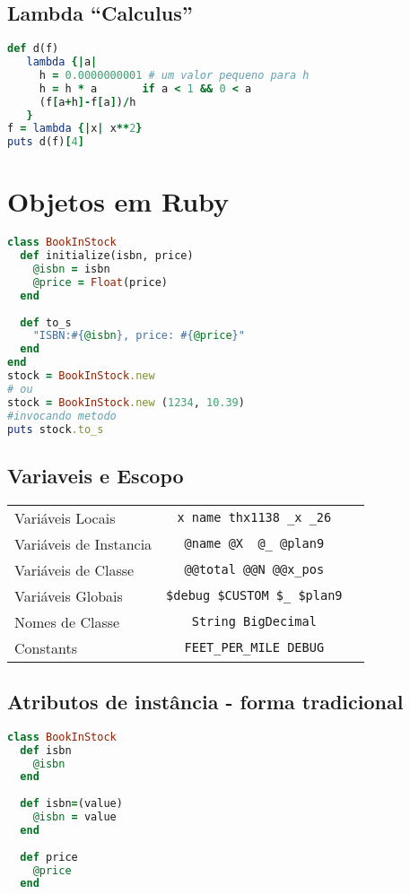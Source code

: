 \documentclass[serif,mathserif]{article}
\begin{document}
\subsection{Lambda ``Calculus''}

\begin{lstlisting}[language=ruby, caption="Derivada em Ruby"]
def d(f)
   lambda {|a|
     h = 0.0000000001 # um valor pequeno para h
     h = h * a       if a < 1 && 0 < a
     (f[a+h]-f[a])/h
   }
f = lambda {|x| x**2}
puts d(f)[4]
\end{lstlisting}

\section{Objetos em Ruby}
\begin{lstlisting}[language=ruby]
class BookInStock
  def initialize(isbn, price)
    @isbn = isbn
    @price = Float(price)
  end
 
  def to_s
    "ISBN:#{@isbn}, price: #{@price}"
  end
end
stock = BookInStock.new
# ou
stock = BookInStock.new (1234, 10.39)
#invocando metodo
puts stock.to_s
\end{lstlisting}


\subsection{Variaveis e Escopo}

\begin{tabular}{ l | c | r }
Variáveis Locais & \verb|x name thx1138 _x _26| \\
Variáveis de Instancia & \verb|@name @X  @_ @plan9| \\
Variáveis de Classe & \verb|@@total @@N @@x_pos| \\
Variáveis Globais & \verb|$debug $CUSTOM $_ $plan9| \\
Nomes de Classe & \verb|String BigDecimal| \\
Constants & \verb|FEET_PER_MILE DEBUG|
\end{tabular}

\subsection{Atributos de instância - forma tradicional}
\begin{lstlisting}[language=ruby]
class BookInStock  
  def isbn
    @isbn
  end
 
  def isbn=(value)
    @isbn = value
  end
 
  def price
    @price
  end
\end{lstlisting}
\end{document}
